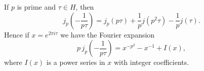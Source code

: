 If $p$ is prime and $\tau \in H$, then
$$j_p\left(-\frac{1}{p\tau}\right) = j_p(p\tau) + \frac{1}{p} j(p^2\tau) - \frac{1}{p} j(\tau).$$
Hence if $x = e^{2\pi i\tau}$ we have the Fourier expansion
$$p\,j_p\left(-\frac{1}{p\tau}\right) = x^{-p^2} - x^{-1} + I(x),$$
where $I(x)$ is a power series in $x$ with integer coefficients.
